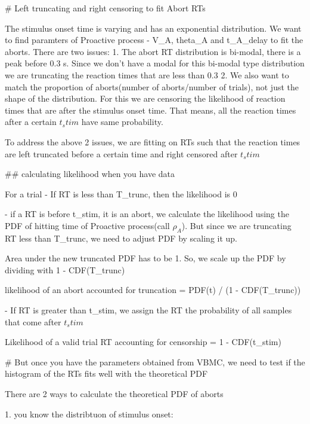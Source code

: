 # Left truncating and right censoring to fit Abort RTs

The stimulus onset time is varying and has an exponential distribution. We want to find paramters of Proactive process 
- V_A, theta_A and t_A_delay to fit the aborts. There are two issues:
1. The abort RT distribution is bi-modal, there is a peak before 0.3 s. Since we don't have a modal for this bi-modal type distribution
we are truncating the reaction times that are less than 0.3
2. We also want to match the proportion of aborts(number of aborts/number of trials), not just the shape of the distribution. 
For this we are censoring the likelihood of reaction times that are after the stimulus onset time. That means, all the reaction times
after a certain  $t_stim$ have same probability.


To address the above 2 issues, we are fitting on RTs such that the reaction times are left truncated before a certain time
 and right censored after $t_stim$


## calculating likelihood when you have data

For a trial
- If RT is less than T_trunc, then the likelihood is 0

- if a RT is before t_stim, it is an abort, we calculate the likelihood using the PDF of hitting time of Proactive process(call $\rho_A$).
But since we are truncating RT less than T_trunc, we need to adjust PDF by scaling it up. 





Area under the new truncated PDF has to be 1. So, we scale up the PDF by dividing with 1 - CDF(T_trunc)

likelihood of an abort accounted for truncation = PDF(t) / (1 - CDF(T_trunc))


- If RT is greater than t_stim, we assign the RT the probability of all samples that come after $t_stim$

Likelihood of a valid trial RT accounting for censorship = 1 - CDF(t_stim)



# But once you have the parameters obtained from VBMC, we need to test if the histogram of the RTs fits well with the theoretical PDF

There are 2 ways to calculate the theoretical PDF of aborts

1. you know the distribtuon of stimulus onset:

